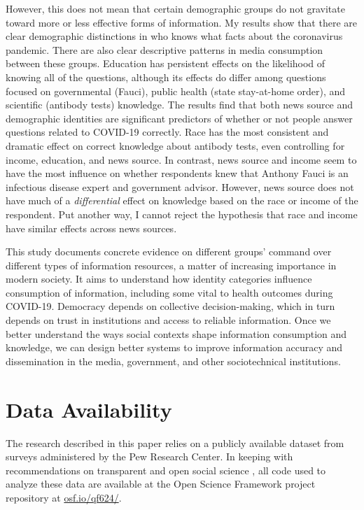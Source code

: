 \documentclass[11pt]{article}
\begin{document}
However, this does not mean that certain demographic groups do not gravitate toward more or less effective forms of information. My results show that there are clear demographic distinctions in who knows what facts about the coronavirus pandemic. There are also clear descriptive patterns in media consumption between these groups. Education has persistent effects on the likelihood of knowing all of the questions, although its effects do differ among questions focused on governmental  (Fauci), public health (state stay-at-home order), and scientific (antibody tests) knowledge. The results find that both news source and demographic identities are significant predictors of whether or not people answer questions related to COVID-19 correctly. Race has the most consistent and dramatic effect on correct knowledge about antibody tests, even controlling for income, education, and news source. In contrast, news source and income seem to have the most influence on whether respondents knew that Anthony Fauci is an infectious disease expert and government advisor. However, news source does not have much of a \emph{differential} effect on knowledge based on the race or income of the respondent. Put another way, I cannot reject the hypothesis that race and income have similar effects across news sources.

This study documents concrete evidence on different groups' command over different types of information resources, a matter of increasing importance in modern society. It aims to understand how identity categories influence consumption of information, including some vital to health outcomes during COVID-19. Democracy depends on collective decision-making, which in turn depends on trust in institutions and access to reliable information. Once we better understand the ways social contexts shape information consumption and knowledge, we can design better systems to improve information accuracy and dissemination in the media, government, and other sociotechnical institutions.




\section{Data Availability}\label{sec:data-availability}

The research described in this paper relies on a publicly available dataset from surveys administered by the Pew Research Center.
In keeping with recommendations on transparent and open social science \citep{Freese2018}, all code used to analyze these data are available at the Open Science Framework project repository at \url{osf.io/qf624/}.
\end{document}

